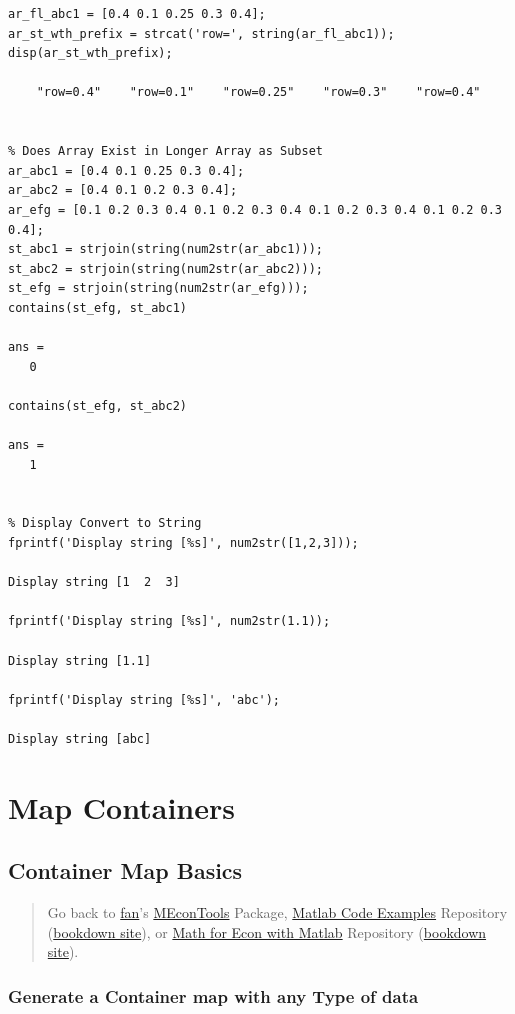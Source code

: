 \documentclass[
]{book}
\begin{document}
\begin{verbatim}
ar_fl_abc1 = [0.4 0.1 0.25 0.3 0.4];
ar_st_wth_prefix = strcat('row=', string(ar_fl_abc1));
disp(ar_st_wth_prefix);

    "row=0.4"    "row=0.1"    "row=0.25"    "row=0.3"    "row=0.4"


% Does Array Exist in Longer Array as Subset
ar_abc1 = [0.4 0.1 0.25 0.3 0.4];
ar_abc2 = [0.4 0.1 0.2 0.3 0.4];
ar_efg = [0.1 0.2 0.3 0.4 0.1 0.2 0.3 0.4 0.1 0.2 0.3 0.4 0.1 0.2 0.3 0.4];
st_abc1 = strjoin(string(num2str(ar_abc1)));
st_abc2 = strjoin(string(num2str(ar_abc2)));
st_efg = strjoin(string(num2str(ar_efg)));
contains(st_efg, st_abc1)

ans = 
   0

contains(st_efg, st_abc2)

ans = 
   1


% Display Convert to String
fprintf('Display string [%s]', num2str([1,2,3]));

Display string [1  2  3]

fprintf('Display string [%s]', num2str(1.1));

Display string [1.1]

fprintf('Display string [%s]', 'abc');

Display string [abc]
\end{verbatim}

\hypertarget{map-containers}{%
\section{Map Containers}\label{map-containers}}

\hypertarget{container-map-basics}{%
\subsection{Container Map Basics}\label{container-map-basics}}

\begin{quote}
Go back to \href{http://fanwangecon.github.io/}{fan}'s \href{https://fanwangecon.github.io/MEconTools/}{MEconTools} Package, \href{https://fanwangecon.github.io/M4Econ/}{Matlab Code Examples} Repository (\href{https://fanwangecon.github.io/M4Econ/bookdown}{bookdown site}), or \href{https://fanwangecon.github.io/Math4Econ/}{Math for Econ with Matlab} Repository (\href{https://fanwangecon.github.io/Math4Econ/bookdown}{bookdown site}).
\end{quote}

\hypertarget{generate-a-container-map-with-any-type-of-data}{%
\subsubsection{Generate a Container map with any Type of data}\label{generate-a-container-map-with-any-type-of-data}}
\end{document}
